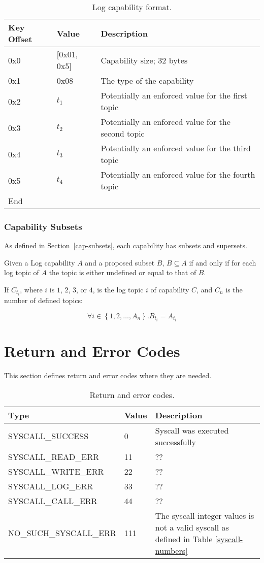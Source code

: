 \documentclass[english,a4paper]{article}
\let\oldparagraph\subsubsection
\renewcommand{\subsubsection}[1]{\oldparagraph{#1}\mbox{}}
\begin{document}
\begin{table}[H]
  \caption{Log capability format.}
  \centering{}%
  \begin{tabular}{l|l|p{}}
    \hline
    Key Offset & Value & Description\tabularnewline
    \hline
    \hline
    0x0 & [0x01, 0x5] & Capability size; 32 bytes \tabularnewline
    0x1 & 0x08 & The type of the capability \tabularnewline
    0x2 & $t_1$ & Potentially an enforced value for the first topic\tabularnewline
    0x3 & $t_2$ & Potentially an enforced value for the second topic\tabularnewline
    0x4 & $t_3$ & Potentially an enforced value for the third topic\tabularnewline
    0x5 & $t_4$ & Potentially an enforced value for the fourth topic\tabularnewline
    \hline
    End &  \tabularnewline
    \hline
  \end{tabular}
\end{table}

\subsubsection{Capability Subsets}
As defined in Section~\ref{cap-subsets}, each capability has subsets and
supersets.

Given a Log capability $A$ and a proposed subset $B$, $B \subseteq A$ if and
only if for each log topic of $A$ the topic is either undefined or equal to that
of $B$.

If $C_{t_i}$, where $i$ is $1$, $2$, $3$, or $4$, is the log topic $i$ of
capability $C$, and $C_n$ is the number of defined topics:

$$ \forall i \in \left\{1,2,\dots ,A_n\right\}. B_{t_i} = A_{t_i} $$

\section{Return and Error Codes}
This section defines return and error codes where they are needed.

\begin{table}[H]
  \caption{Return and error codes.}
  \centering{}%
  \begin{tabular}{l|l|p{}}
    \hline
    Type & Value & Description\tabularnewline
    \hline
    \hline
    SYSCALL\_SUCCESS      & 0 & Syscall was executed successfully \tabularnewline
    SYSCALL\_READ\_ERR    & 11 & ?? \tabularnewline
    SYSCALL\_WRITE\_ERR   & 22 & ?? \tabularnewline
    SYSCALL\_LOG\_ERR     & 33 & ?? \tabularnewline
    SYSCALL\_CALL\_ERR    & 44 & ?? \tabularnewline
    NO\_SUCH\_SYSCALL\_ERR & 111 & The syscall integer values is not a valid
      syscall as defined in Table \ref{syscall-numbers} \tabularnewline
    \hline
  \end{tabular}
\end{table}
\end{document}
